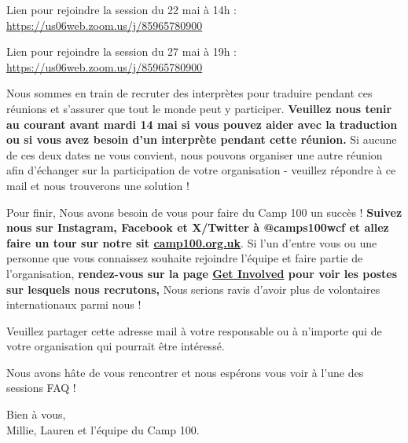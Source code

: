 \documentclass[a4paper, 11pt]{report}
\begin{document}
Lien pour rejoindre la session du 22 mai \`a 14h :\\
\href{https://us06web.zoom.us/j/85965780900}{https://us06web.zoom.us/j/85965780900}

Lien pour rejoindre la session du 27 mai \`a 19h :\\
\href{https://us06web.zoom.us/j/85965780900}{https://us06web.zoom.us/j/85965780900}

Nous sommes en train de recruter des interprètes pour traduire pendant ces r\'eunions et s'assurer que tout le monde peut y participer. \textbf{Veuillez nous tenir au courant avant mardi 14 mai si vous pouvez aider avec la traduction ou si vous avez besoin d'un interprète pendant cette r\'eunion.} Si aucune de ces deux dates ne vous convient, nous pouvons organiser une autre r\'eunion afin d'\'echanger sur la participation de votre organisation - veuillez r\'epondre \`a ce mail et nous trouverons une solution !

Pour finir,  Nous avons besoin de vous pour faire du Camp 100 un succès ! \textbf{Suivez nous sur Instagram, Facebook et X/Twitter \`a @camps100wcf et allez faire un tour sur notre sit \href{https://camp100.org.uk}{camp100.org.uk}}. Si l'un d'entre vous ou une personne que vous connaissez souhaite rejoindre l'\'equipe et faire partie de l'organisation, \textbf{rendez-vous sur la page \href{https://camp100.org.uk/get-involved/}{Get Involved} pour voir les postes sur lesquels nous recrutons,} Nous serions ravis d'avoir plus de volontaires internationaux parmi nous ! 

Veuillez partager cette adresse mail \`a votre responsable ou \`a n'importe qui de votre organisation qui pourrait \^etre int\'eress\'e.

Nous avons hâte de vous rencontrer et nous esp\'erons vous voir \`a l'une des sessions FAQ !

Bien \`a vous, \\
Millie, Lauren et l'\'equipe du Camp 100.


\makedocumentbackpage
\end{document}
